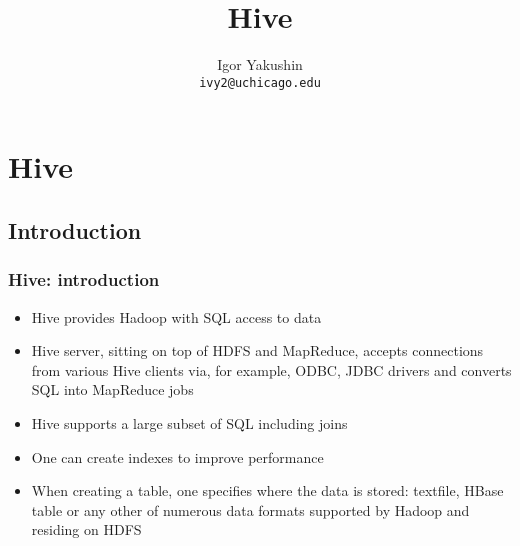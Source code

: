 \documentclass{beamer}
\title{\huge{Hive}}
\author{Igor Yakushin \\ \texttt{ivy2@uchicago.edu}}
\date{}
\begin{document}



\begin{frame}
\titlepage
\end{frame}


\section{Hive}
\subsection{Introduction}
\begin{frame}
 \frametitle{Hive: introduction}
 \begin{itemize}
  \item Hive provides Hadoop with SQL access to data
  \item Hive server, sitting on top of HDFS and MapReduce, accepts connections from various Hive clients via, for example, ODBC, JDBC drivers and converts SQL into MapReduce jobs
  \item Hive supports a large subset of SQL including joins
  \item One can create indexes to improve performance
  \item When creating a table, one specifies where the data is stored: textfile, HBase table or any other of numerous data formats supported by Hadoop and residing on HDFS
 \end{itemize}

\end{frame}
\end{document}
